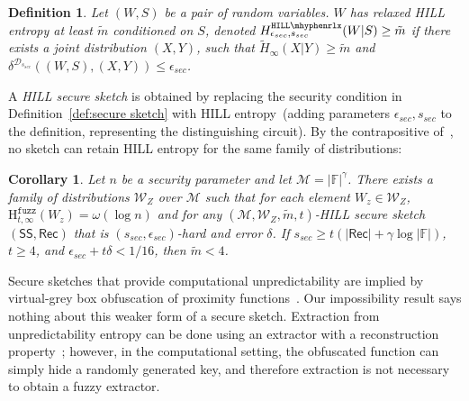 \documentclass[11pt]{article}
\newcommand{\defref}[1]{\mbox{Definition~\ref{#1}}}
\newcommand{\class}[1]{{\ensuremath{\mathsf{#1}}}}
\newcommand{\sketch}{\ensuremath{\class{SS}}\xspace}
\newcommand{\rec}{\ensuremath{\class{Rec}}\xspace}
\newcommand{\hillrlx}{\ensuremath{\mathtt{HILL\mhyphen rlx}}\xspace}
\newcommand{\Hfuzz}{\mathrm{H}^{\mathtt{fuzz}}_{t,\infty}}
\newtheorem{corollary}[theorem]{Corollary}
\newtheorem{definition}[theorem]{Definition}
\begin{document}
\begin{definition}
\label{def:relaxed hill}
Let $(W, S)$ be a pair of random variables.  $W$ has 
\emph{relaxed HILL entropy} at least $\tilde{m}$ conditioned on $S$,
denoted $H^{\hillrlx}_{\epsilon_{sec}, s_{sec}}(W|S)\geq \tilde{m}$ if there exists a joint distribution $(X, Y)$, such that $\tilde{H}_\infty(X|Y)\geq \tilde{m}$ and $\delta^{\mathcal{D}_{s_{sec}}} ((W, S),(X,Y))\leq \epsilon_{sec}$.
\end{definition}

A \emph{HILL secure sketch} is obtained by replacing the security condition in \defref{def:secure sketch} with HILL entropy~(adding parameters $\epsilon_{sec}, s_{sec}$ to the definition, representing the distinguishing circuit).  By the contrapositive of~\cite[Corollary 3.8]{fuller2013computational}, no sketch can retain HILL entropy for the same family of distributions:

\begin{corollary}
\label{cor:imposs comp sketch}
Let $n$ be a security parameter and let $\mathcal{M} = |\mathbb{F}|^\gamma$.  There exists a family of distributions $\mathcal{W}_Z$ over $\mathcal{M}$ such that for each element $W_z\in \mathcal{W}_Z$, $\Hfuzz(W_z)= \omega(\log n)$ and for any $(\mathcal{M}, \mathcal{W}_Z, \tilde{m}, t)$-HILL secure sketch $(\sketch, \rec)$ that is $(s_{sec}, \epsilon_{sec})$-hard and error $\delta$.  If 
$s_{sec}\ge t(|\rec| + \gamma \log |\mathbb{F}|)$, 
$t\ge 4$, and 
 $\epsilon_{sec} + t\delta < 1/16$,
 then $\tilde{m} <4$.
\end{corollary}



\noindent
Secure sketches that provide computational unpredictability are implied by virtual-grey box obfuscation of proximity functions~\cite{BitanskyCKP14}.  Our impossibility result says nothing about this weaker form of a secure sketch.  Extraction from unpredictability entropy can be done using an extractor with a reconstruction property~\cite{barak-computational, DBLP:conf/eurocrypt/HsiaoLR07}; however, in the computational setting, the obfuscated function can simply hide a randomly generated key, and therefore extraction is not necessary to obtain a fuzzy extractor.
\end{document}
